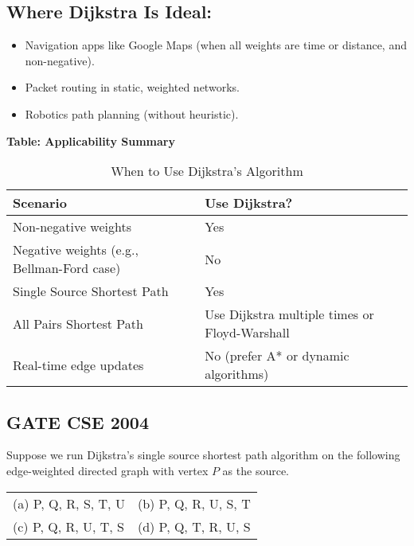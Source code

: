 \documentclass[a4paper,14pt]{extarticle}
\renewcommand{\arraystretch}{1.3}
\begin{document}
\subsection{Where Dijkstra Is Ideal:}
\begin{itemize}
    \item Navigation apps like Google Maps (when all weights are time or distance, and non-negative).
    \item Packet routing in static, weighted networks.
    \item Robotics path planning (without heuristic).
\end{itemize}

\textbf{Table: Applicability Summary}

\begin{table}[H]
\centering
\renewcommand{\arraystretch}{1.3}
\begin{tabularx}{\textwidth}{|X|X|}
\hline
\textbf{Scenario} & \textbf{Use Dijkstra?} \\
\hline
Non-negative weights & Yes \\
Negative weights (e.g., Bellman-Ford case) & No \\
Single Source Shortest Path & Yes \\
All Pairs Shortest Path & Use Dijkstra multiple times or Floyd-Warshall \\
Real-time edge updates & No (prefer A* or dynamic algorithms) \\
\hline
\end{tabularx}
\caption{When to Use Dijkstra's Algorithm}
\end{table}




\subsection{GATE CSE 2004}
Suppose we run Dijkstra’s single source shortest path algorithm on the 
following edge-weighted directed graph with vertex $P$ as the source.



\begin{tabular}{ll}
(a) P, Q, R, S, T, U \hspace{4cm} & (b) P, Q, R, U, S, T \\
(c) P, Q, R, U, T, S \hspace{4cm} & (d) P, Q, T, R, U, S \\
\end{tabular}
\vspace{0.5cm}
\end{document}
